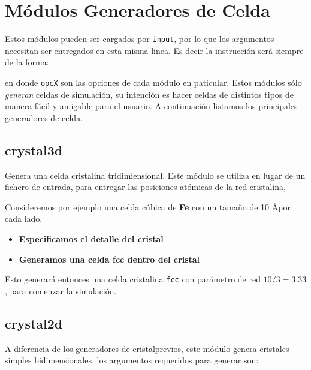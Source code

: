 \section{M\'odulos Generadores de Celda}
\label{chap:modulos:generadores}
Estos m\'odulos pueden ser cargados por \verb|input|, por lo que los argumentos necesitan ser entregados en esta misma linea. Es decir la instrucci\'on ser\'a siempre de la forma:


en donde \verb|opcX| son las opciones de cada m\'odulo en paticular. Estos m\'odulos s\'olo \textit{generan} celdas de simulaci\'on, su intenci\'on es hacer celdas de distintos tipos de manera f\'acil y amigable para el usuario. A continuaci\'on listamos los principales generadores de celda.

\subsection{crystal3d}
Genera una celda cristalina tridimiensional. Este m\'odulo se utiliza en lugar de un fichero de entrada, para entregar las posiciones at\'omicas de la red cristalina, 


Consideremos por ejemplo una celda c\'ubica de \textbf{Fe} con un tama\~no de 10 \AA por cada lado.

\begin{itemize}
 \item \textbf{Especificamos el detalle del cristal}
 \item \textbf{Generamos una celda  fcc dentro del cristal}
\end{itemize}

Esto generar\'a entonces una celda cristalina \verb|fcc| con par\'ametro de red $10/3 = 3.33$, para comenzar la simulaci\'on.

\subsection{crystal2d}
A diferencia de los generadores de cristalprevios, este m\'odulo genera cristales simples bidimensionales, los argumentos requeridos para generar son:

